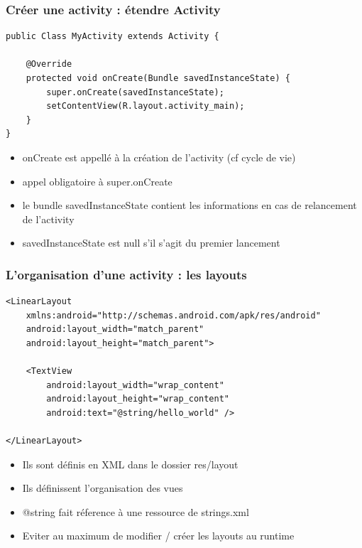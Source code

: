 \documentclass{beamer}
\begin{document}
\begin{frame}[fragile]
\frametitle{Créer une activity : étendre Activity} 
\begin{lstlisting}
public Class MyActivity extends Activity {

    @Override
    protected void onCreate(Bundle savedInstanceState) {
        super.onCreate(savedInstanceState);
        setContentView(R.layout.activity_main);
    }
}
\end{lstlisting}
 \begin{itemize}
 \item onCreate est appellé à la création de l'activity (cf cycle de vie)
 \item appel obligatoire à super.onCreate
 \item le bundle savedInstanceState contient les informations en cas de
 relancement de l'activity
 \item savedInstanceState est null s'il s'agit du premier lancement
 \end{itemize}
\end{frame}
\begin{frame}[fragile]
\frametitle{L'organisation d'une activity : les layouts} 
\begin{lstlisting}
<LinearLayout 
	xmlns:android="http://schemas.android.com/apk/res/android"
    android:layout_width="match_parent"
    android:layout_height="match_parent">

    <TextView
        android:layout_width="wrap_content"
        android:layout_height="wrap_content"
        android:text="@string/hello_world" />
        
</LinearLayout>
\end{lstlisting}
 \begin{itemize}
 \item Ils sont définis en XML dans le dossier res/layout
 \item Ils définissent l'organisation des vues
 \item @string fait réference à une ressource de strings.xml
 \item Eviter au maximum de modifier / créer les layouts au runtime
 \end{itemize}
\end{frame}
\end{document}
